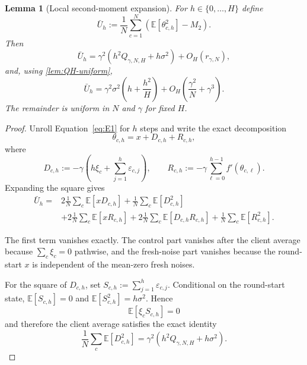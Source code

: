 \documentclass[11pt]{article}
\newtheorem{lemma}[lemma]{Lemma}
\theoremstyle{definition}
\newcommand{\E}{\mathbb{E}}
\newcommand{\remscale}{r_{\gamma,N}}
\newcommand{\QH}{Q_{\gamma,N,H}}
\newcommand{\Ubar}{\bar U}
\newcommand{\eps}{\varepsilon}
\begin{document}
\begin{lemma}[Local second-moment expansion]
\label{lem:G3}
For $h\in\{0,\ldots,H\}$ define
\[
  \Ubar_h:=\frac1N\sum_{c=1}^N\left(\E[\theta_{c,h}^2]-M_2\right).
\]
Then
\begin{equation}
\label{eq:G3-QH}
  \Ubar_h
  =\gamma^2\left(h^2\QH+h\sigma^2\right)+O_H(\remscale),
\end{equation}
and, using \cref{lem:QH-uniform},
\begin{equation}
\label{eq:G3-final}
  \Ubar_h
  =\gamma^2\sigma^2\left(h+\frac{h^2}{H}\right)
   +O_H\left(\frac{\gamma^2}{N}+\gamma^3\right).
\end{equation}
The remainder is uniform in $N$ and $\gamma$ for fixed $H$.
\end{lemma}

\begin{proof}
Unroll Equation~\eqref{eq:E1} for $h$ steps and write the exact decomposition
\begin{equation}
\label{eq:G3-decomp}
  \theta_{c,h}=x+D_{c,h}+R_{c,h},
\end{equation}
where
\[
  D_{c,h}:=-\gamma\left(h\xi_c+\sum_{j=1}^h\eps_{c,j}\right),
  \qquad
  R_{c,h}:=-\gamma\sum_{\ell=0}^{h-1}f'(\theta_{c,\ell}).
\]
Expanding the square gives
\begin{equation}
\label{eq:G3-square}
\begin{aligned}
  \Ubar_h={}&
  2\frac1N\sum_c\E[xD_{c,h}]
  +\frac1N\sum_c\E[D_{c,h}^2]\\
  &+2\frac1N\sum_c\E[xR_{c,h}]
  +2\frac1N\sum_c\E[D_{c,h}R_{c,h}]
  +\frac1N\sum_c\E[R_{c,h}^2].
\end{aligned}
\end{equation}

The first term vanishes exactly. The control part vanishes after the client average because $\sum_c\xi_c=0$ pathwise, and the fresh-noise part vanishes because the round-start $x$ is independent of the mean-zero fresh noises.

For the square of $D_{c,h}$, set $S_{c,h}:=\sum_{j=1}^h\eps_{c,j}$. Conditional on the round-start state, $\E[S_{c,h}]=0$ and $\E[S_{c,h}^2]=h\sigma^2$. Hence
\[
  \E[\xi_cS_{c,h}]=0
\]
and therefore the client average satisfies the exact identity
\begin{equation}
\label{eq:D2-exact}
  \frac1N\sum_c\E[D_{c,h}^2]
  =\gamma^2\left(h^2\QH+h\sigma^2\right).
\end{equation}


\end{proof}
\end{document}
